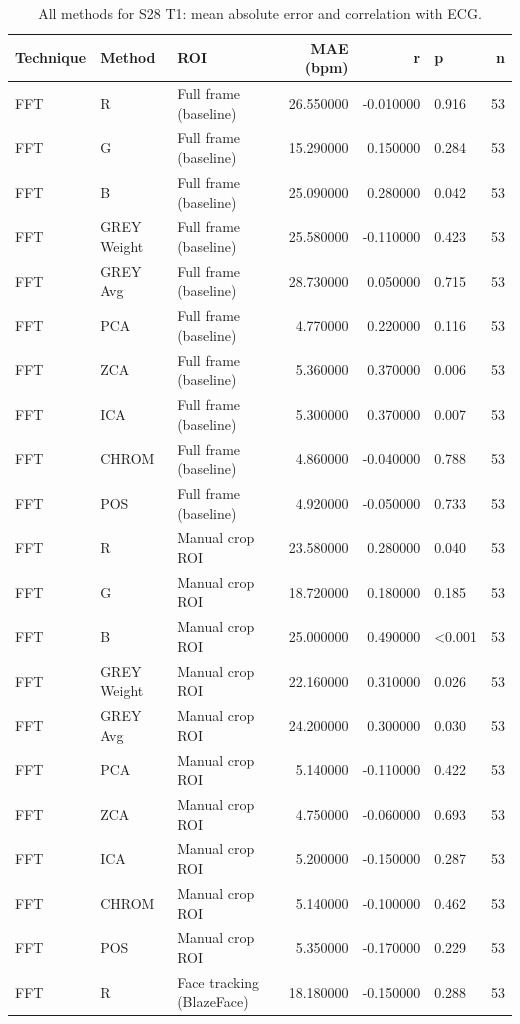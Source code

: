 \begin{table}[htbp]
\centering
\caption{All methods for S28 T1: mean absolute error and correlation with ECG.}
\label{tab:spread_s28_t1}
\begin{tabular}{l l l r r l r}
\toprule
Technique & Method & ROI & MAE (bpm) & r & p & n \\
\midrule
FFT & R & Full frame (baseline) & 26.550000 & -0.010000 & 0.916 & 53 \\
FFT & G & Full frame (baseline) & 15.290000 & 0.150000 & 0.284 & 53 \\
FFT & B & Full frame (baseline) & 25.090000 & 0.280000 & 0.042 & 53 \\
FFT & GREY Weight & Full frame (baseline) & 25.580000 & -0.110000 & 0.423 & 53 \\
FFT & GREY Avg & Full frame (baseline) & 28.730000 & 0.050000 & 0.715 & 53 \\
FFT & PCA & Full frame (baseline) & 4.770000 & 0.220000 & 0.116 & 53 \\
FFT & ZCA & Full frame (baseline) & 5.360000 & 0.370000 & 0.006 & 53 \\
FFT & ICA & Full frame (baseline) & 5.300000 & 0.370000 & 0.007 & 53 \\
FFT & CHROM & Full frame (baseline) & 4.860000 & -0.040000 & 0.788 & 53 \\
FFT & POS & Full frame (baseline) & 4.920000 & -0.050000 & 0.733 & 53 \\
FFT & R & Manual crop ROI & 23.580000 & 0.280000 & 0.040 & 53 \\
FFT & G & Manual crop ROI & 18.720000 & 0.180000 & 0.185 & 53 \\
FFT & B & Manual crop ROI & 25.000000 & 0.490000 & <0.001 & 53 \\
FFT & GREY Weight & Manual crop ROI & 22.160000 & 0.310000 & 0.026 & 53 \\
FFT & GREY Avg & Manual crop ROI & 24.200000 & 0.300000 & 0.030 & 53 \\
FFT & PCA & Manual crop ROI & 5.140000 & -0.110000 & 0.422 & 53 \\
FFT & ZCA & Manual crop ROI & 4.750000 & -0.060000 & 0.693 & 53 \\
FFT & ICA & Manual crop ROI & 5.200000 & -0.150000 & 0.287 & 53 \\
FFT & CHROM & Manual crop ROI & 5.140000 & -0.100000 & 0.462 & 53 \\
FFT & POS & Manual crop ROI & 5.350000 & -0.170000 & 0.229 & 53 \\
FFT & R & Face tracking (BlazeFace) & 18.180000 & -0.150000 & 0.288 & 53 \\

\end{tabular}
\end{table}
